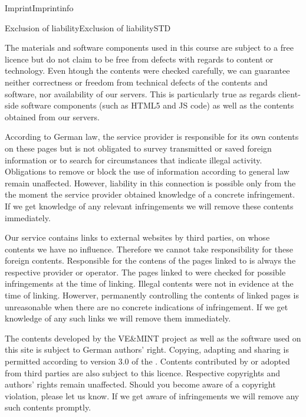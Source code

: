 \begin{MXContent}{Imprint}{Imprint}{info}
\end{MXContent}

\begin{MXContent}{Exclusion of liability}{Exclusion of liability}{STD}

The materials and software components used in this course are subject to a free licence but do not claim to be free from defects with regards to content or technology.
Even htough the contents were checked carefully, we can guarantee neither correctness or freedom from technical defects of the contents and software, nor availability of our servers.
This is particularly true as regards client-side software components (such as HTML5 and JS code) as well as the contents obtained from our servers.

According to German law, the service provider is responsible for its own contents on these pages but is not obligated to survey transmitted or saved foreign information
or to search for circumstances that indicate illegal activity.
Obligations to remove or block the use of information according to general law remain unaffected.
However, liability in this connection is possible only from the the moment the service provider obtained knowledge of a concrete infringement.
If we get knowledge of any relevant infringements we will remove these contents immediately.

Our service contains links to external websites by third parties, on whose contents we have no influence.
Therefore we cannot take responsibility for these foreign contents.
Responsible for the contens of the pages linked to is always the respective provider or operator.
The pages linked to were checked for possible infringements at the time of linking. Illegal contents were not in evidence at the time of linking.
Howerver, permanently controlling the contents of linked pages is unreasonable when there are no concrete indications of infringement.
If we get knowledge of any such links we will remove them immediately.

The contents developed by the VE\&MINT project as well as the software used on this site is subject to German authors' right.
Copying, adapting and sharing is permitted according to version 3.0 of the .
Contents contributed by or adopted from third parties are also subject to this licence. Respective copyrights and authors' rights remain unaffected.
Should you become aware of a copyright violation, please let us know. If we get aware of infringements we will remove any such contents promptly.
\end{MXContent}
